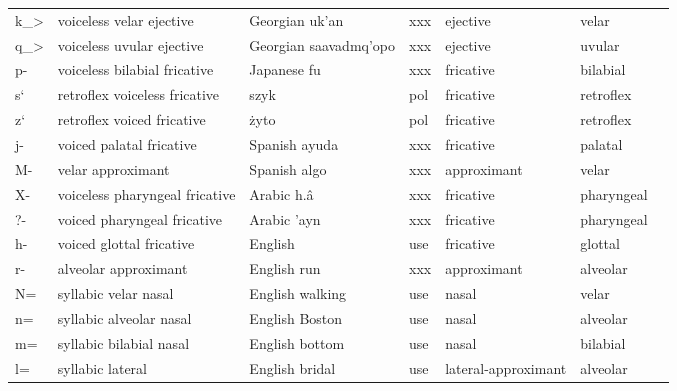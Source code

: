 \begin{longtable}{l|p{.3\linewidth}|p{.15\linewidth}|l|l|l|l}
	k\_\textgreater	& voiceless velar ejective	& Georgian uk'an	& xxx	& ejective	& velar	\\
	q\_\textgreater	& voiceless uvular ejective	& Georgian saavadmq'opo	& xxx	& ejective	& uvular\\
	p-	& voiceless bilabial fricative	& Japanese fu	& xxx	& fricative	& bilabial	\\
	s`	& retroflex voiceless fricative	& szyk	& pol	& fricative	& retroflex	\\
	z`	& retroflex voiced fricative	& żyto	& pol	& fricative	& retroflex	\\
	j-	& voiced palatal fricative	& Spanish ayuda	& xxx	& fricative	& palatal	\\
	M-	& velar approximant	& Spanish algo	& xxx	& approximant	& velar	\\
	X-	& voiceless pharyngeal fricative	& Arabic h.â	& xxx	& fricative	& pharyngeal	\\
	?-	& voiced pharyngeal fricative	& Arabic 'ayn	& xxx	& fricative	& pharyngeal	\\
	h-	& voiced glottal fricative	& English	& use	& fricative	& glottal	\\
	r-	& alveolar approximant	& English run	& xxx	& approximant	& alveolar	\\
	N=	& syllabic velar nasal	& English walking	& use	& nasal	& velar	\\
	n=	& syllabic alveolar nasal	& English Boston	& use	& nasal	& alveolar	\\
	m=	& syllabic bilabial nasal	& English bottom	& use	& nasal	& bilabial	\\
	l=	& syllabic lateral	& English bridal	& use	& lateral-approximant	& alveolar	\\
\end{longtable}

\newpage
